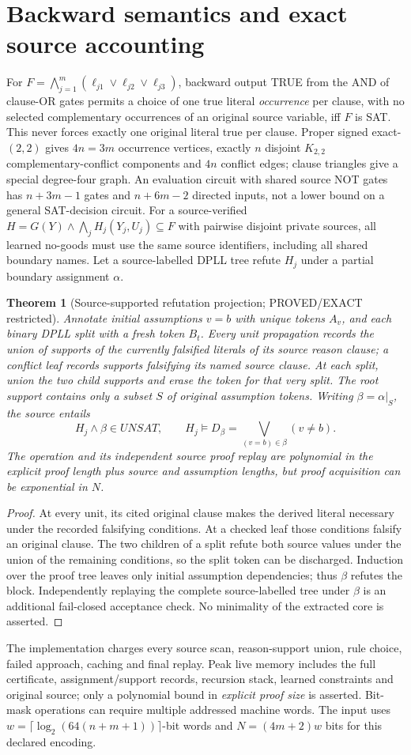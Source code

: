 \documentclass[11pt]{article}
\newtheorem{theorem}{Theorem}
\begin{document}
\section{Backward semantics and exact source accounting}
For $F=\bigwedge_{j=1}^m(\ell_{j1}\vee\ell_{j2}\vee\ell_{j3})$, backward output TRUE from the AND of clause-OR gates permits a choice of one true literal \emph{occurrence} per clause, with no selected complementary occurrences of an original source variable, iff $F$ is SAT. This never forces exactly one original literal true per clause. Proper signed exact-$(2,2)$ gives $4n=3m$ occurrence vertices, exactly $n$ disjoint $K_{2,2}$ complementary-conflict components and $4n$ conflict edges; clause triangles give a special degree-four graph. An evaluation circuit with shared source NOT gates has $n+3m-1$ gates and $n+6m-2$ directed inputs, not a lower bound on a general SAT-decision circuit.
For a source-verified $H=G(Y)\wedge\bigwedge_j H_j(Y_j,U_j)\subseteq F$ with pairwise disjoint private sources, all learned no-goods must use the same source identifiers, including all shared boundary names. Let a source-labelled DPLL tree refute $H_j$ under a partial boundary assignment $\alpha$.
\begin{theorem}[Source-supported refutation projection; PROVED/EXACT restricted]
Annotate initial assumptions $v=b$ with unique tokens $A_v$, and each binary DPLL split with a fresh token $B_t$. Every unit propagation records the union of supports of the currently falsified literals of its source reason clause; a conflict leaf records supports falsifying its named source clause. At each split, union the two child supports and erase the token for that very split. The root support contains only a subset $S$ of original assumption tokens. Writing $\beta=\alpha|_S$, the source entails
\[
H_j\wedge\beta\in UNSAT,\qquad
H_j\models D_\beta=\bigvee_{(v=b)\in\beta}(v\ne b).
\]
The operation and its independent source proof replay are polynomial in the \emph{explicit proof length} plus source and assumption lengths, but proof acquisition can be exponential in $N$.
\end{theorem}
\begin{proof}
At every unit, its cited original clause makes the derived literal necessary under the recorded falsifying conditions. At a checked leaf those conditions falsify an original clause. The two children of a split refute both source values under the union of the remaining conditions, so the split token can be discharged. Induction over the proof tree leaves only initial assumption dependencies; thus $\beta$ refutes the block. Independently replaying the complete source-labelled tree under $\beta$ is an additional fail-closed acceptance check. No minimality of the extracted core is asserted.
\end{proof}
The implementation charges every source scan, reason-support union, rule choice, failed approach, caching and final replay. Peak live memory includes the full certificate, assignment/support records, recursion stack, learned constraints and original source; only a polynomial bound in \emph{explicit proof size} is asserted. Bit-mask operations can require multiple addressed machine words. The input uses $w=\lceil\log_2(64(n+m+1))\rceil$-bit words and $N=(4m+2)w$ bits for this declared encoding.
\end{document}
